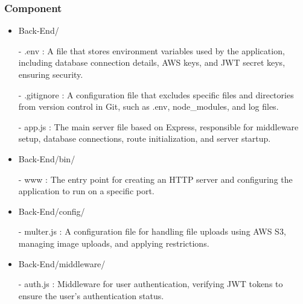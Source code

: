             \subsubsection{Component}
                \begin{itemize}
                    \item Back-End/
                        \item[-] .env : A file that stores environment variables used by the application, including database connection details, AWS keys, and JWT secret keys, ensuring security.
                        \item[-] .gitignore : A configuration file that excludes specific files and directories from version control in Git, such as .env, node\_modules, and log files.
                        \item[-] app.js : The main server file based on Express, responsible for middleware setup, database connections, route initialization, and server startup.
                    \vspace{3mm}
                    
                    \item Back-End/bin/
                        \item[-] www : The entry point for creating an HTTP server and configuring the application to run on a specific port.
                    \vspace{3mm}
                    
                    \item Back-End/config/
                        \item[-] multer.js : A configuration file for handling file uploads using AWS S3, managing image uploads, and applying restrictions.
                    \vspace{3mm}
                    
                    \item Back-End/middleware/
                        \item[-] auth.js : Middleware for user authentication, verifying JWT tokens to ensure the user's authentication status.
                    \vspace{3mm}
                    

\end{itemize}
